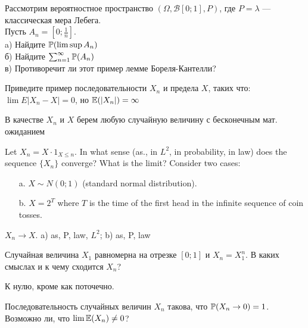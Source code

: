 \begin{problem}
Рассмотрим вероятностное пространство
$(\Omega,\mathcal{B}[0;1],P)$, где $P=\lambda$ --- классическая
мера Лебега.\\
Пусть $A_{n}=[0;\frac{1}{n}]$. \\
a) Найдите $\P(\limsup A_{n})$ \\
б) Найдите $\sum_{n=1}^{\infty}\P(A_{n})$ \\
в) Противоречит ли этот пример лемме Бореля-Кантелли? 
\end{problem} 
\begin{solution} 

\end{solution}

\begin{problem}
Приведите пример последовательности $X_{n}$ и предела $X$, таких что: $\lim E|X_{n}-X|=0$, но $\E(|X_{n}|)=\infty$ 
\end{problem} 
\begin{solution} 
 В качестве $X_{n}$ и $ X $ берем любую случайную величину с бесконечным мат. ожиданием
\end{solution}

\begin{problem}
Let $X_{n}=X\cdot 1_{X\leq n}$. In what sense (as., in $L^{2}$, in probability, in law) does the sequence $ \{X_{n}\} $ converge? What is the limit? Consider two cases:
\begin{itemize}
\item[a.] $ X\sim N(0;1) $ (standard normal distribution).
\item[b.] $ X =2^{T}$ where $T$ is the time of the first head in the infinite sequence of coin tosses.
\end{itemize}

\end{problem} 
\begin{solution} 
 $ X_{n}\to X $. a) as, P, law, $ L^{2} $; b) as, P, law 
\end{solution}

\begin{problem}
Случайная величина $X_1$ равномерна на отрезке $[0;1]$ и $X_n=X_1^n$. В каких смыслах и к чему сходится $X_n$?
\end{problem} 
\begin{solution} 
К нулю, кроме как поточечно.
\end{solution}

\begin{problem}
Последовательность случайных величин $X_n$ такова, что $\P(X_n\to 0)=1$. Возможно ли, что $\lim \E(X_n)\neq 0$?
\end{problem} 
\begin{solution} 

\end{solution}

